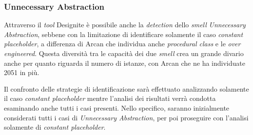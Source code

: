 
\subsubsection{Unnecessary Abstraction}
    Attraverso il \textit{tool} Designite è possibile anche la \textit{detection} dello \textit{smell} \textit{Unnecessary Abstraction}, sebbene con la limitazione di identificare solamente il caso \textit{constant placeholder}, a differenza di Arcan che individua anche \textit{procedural class} e le \textit{over engineered}. Questa diversità tra le capacità dei due \textit{smell} crea un grande divario anche per quanto riguarda il numero di istanze, con Arcan che ne ha individuate 2051 in più.
    
    Il confronto delle strategie di identificazione sarà effettuato analizzando solamente il caso \textit{constant placeholder} mentre l'analisi dei risultati verrà condotta esaminando anche tutti i casi presenti. Nello specifico, saranno inizialmente considerati tutti i casi di \textit{Unnecessary Abstraction}, per poi proseguire con l'analisi solamente di \textit{constant placeholder}.
    
    
